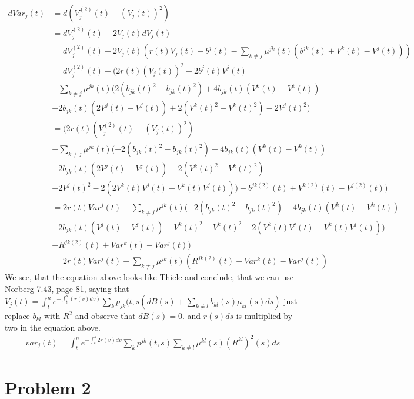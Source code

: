 \documentclass[10pt]{article}
\begin{document}
\begin{equation}
\begin{split}
dVar_j(t) 	& = d(V_j^{(2)}(t) - (V_j(t))^2) \\
			& = dV_j^{(2)}(t) - 2V_j(t)dV_j(t) \\
			& = dV_j^{(2)}(t) - 2V_j(t) (r(t)V_j(t) - b^j(t) - \sum_{k \neq j} \mu^{jk}(t) (b^{jk}(t) + V^k(t) - V^j(t))) \\
			& = dV_j^{(2)}(t) - (2r(t)(V_j(t)) ^2 -2 b^j(t)V^j(t) \\ 
			& - \sum_{k \neq j} \mu^{jk}(t) (2(b_ {jk}(t)^2 - b_ {jk}(t)^2) + 4b_ {jk}(t)(V^k(t) - V^k(t)) \\
			& + 2b_ {jk}(t)(2V^j(t) - V^j(t)) + 2(V^{k}(t)^2 - V^{k}(t)^2) - 2V^{j}(t)^2) \\
			& = (2r(t)(V_j^{(2)}(t) - (V_j(t)) ^2) \\ 
			& - \sum_{k \neq j} \mu^{jk}(t) (-2(b_ {jk}(t)^2 - b_ {jk}(t)^2) - 4b_ {jk}(t)(V^k(t) - V^k(t)) \\
			& - 2b_ {jk}(t)(2V^j(t) - V^j(t)) - 2(V^{k}(t)^2 - V^{k}(t)^2) \\
			& + 2V^{j}(t)^2 - 2(2V^k(t)V^j(t) - V^k(t)V^j(t))) + b^{jk(2)}(t) + V^{k(2)}(t) - V^{j(2)}(t) ) \\
			& = 2r(t)Var^{j}(t) - \sum_{k \neq j} \mu^{jk}(t) (-2(b_ {jk}(t)^2 - b_ {jk}(t)^2) - 4b_ {jk}(t)(V^k(t) - V^k(t)) \\
			& - 2b_ {jk}(t)(V^j(t) - V^j(t)) - V^{k}(t)^2 + V^{k}(t)^2 - 2(V^k(t)V^j(t) - V^k(t)V^j(t))) \\
			& + R^{jk(2)}(t) + Var^{k}(t) - Var^{j}(t) ) \\
			& = 2r(t)Var^{j}(t)  - \sum_{k \neq j} \mu^{jk}(t)(R^{jk(2)}(t) + Var^{k}(t) - Var^{j}(t))
\end{split}
\end{equation}
We see, that the equation above looks like Thiele and conclude, that we  can use Norberg 7.43, page 81, saying that $V_j(t) = \int_t^n e^{-\int_t^s(r(v)dv)}\sum_k p_{jk}(t,s (dB(s) + \sum_{k \neq l} b_{kl}(s)\mu_{kl}(s)ds)$ just replace $b_{kl}$ with $R^2$  and observe that $dB(s) = 0$. and $r(s)ds$ is multiplied by two in the equation above.
\begin{equation}
\begin{split}
var_j(t) = \int_t^n {e^{-\int_t^s{2r(v)dv}} \sum_k p^{jk}(t,s)\sum_{k\neq l} \mu^{kl}(s)(R^{kl})^2(s)ds}
\end{split}
\end{equation}

\section{Problem 2}
\end{document}
